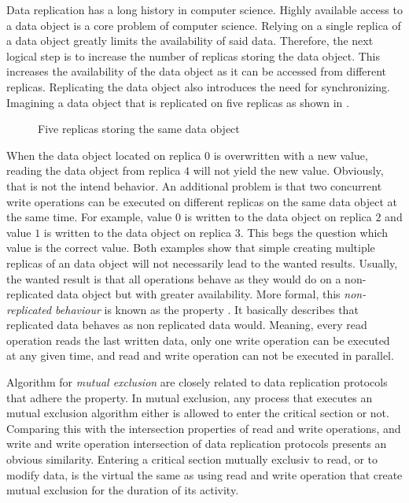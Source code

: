 \documentclass[conference]{IEEEtran}
\begin{document}
Data replication has a long history in computer science.
Highly available access to a data object is a core problem of computer
science.
Relying on a single replica of a data object greatly limits the availability
of said data.
Therefore, the next logical step is to increase the number of replicas storing
the data object.
This increases the availability of the data object as it can be accessed from
different replicas.
Replicating the data object also introduces the need for synchronizing.
Imagining a data object that is replicated on five replicas as shown in 
.
\begin{figure}
\centering
	
\caption{Five replicas storing the same data object}
\label{fig:fivereplicas}
\end{figure}
When the data object located on replica \(0\) is overwritten with a new value,
reading the data object from replica \(4\) will not yield the new value.
Obviously, that is not the intend behavior.
An additional problem is that two concurrent write operations can be executed
on different replicas on the same data object at the same time.
For example, value \(0\) is written to the data object on replica \(2\) and
value \(1\) is written to the data object on replica \(3\).
This begs the question which value is the correct value.
Both examples show that simple creating multiple replicas of an data
object will not necessarily lead to the wanted results.
Usually, the wanted result is that all operations behave as they
would do on a non-replicated data object but with greater availability.
More formal, this \emph{non-replicated behaviour} is known as the 
property \cite{BHG87:ccr}.
It basically describes that replicated data behaves as non replicated data
would.
Meaning, every read operation reads the last written data, only one write
operation can be executed at any given time, and read and write operation can
not be executed in parallel.

Algorithm for \emph{mutual exclusion} are closely related to data replication
protocols that adhere the  property.
In mutual exclusion, any process that executes an mutual exclusion algorithm
either is allowed to enter the critical section or not.
Comparing this with the intersection properties of read and write operations,
and write and write operation intersection of data replication protocols
presents an obvious similarity.
Entering a critical section mutually exclusiv to read, or to modify data, is
the virtual the same as using read and write operation that create mutual
exclusion for the duration of its activity.
\end{document}
